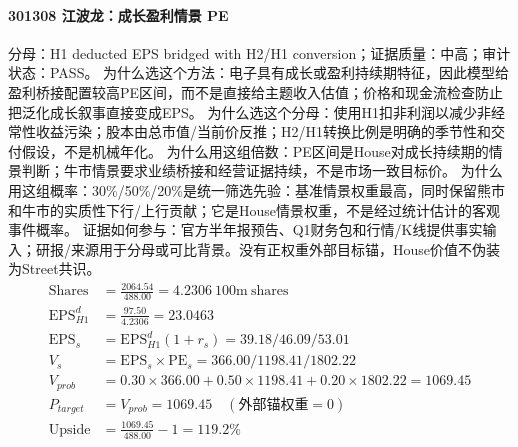 \paragraph{301308 江波龙：成长盈利情景 PE}
分母：H1 deducted EPS bridged with H2/H1 conversion；证据质量：中高；审计状态：PASS。
为什么选这个方法：电子具有成长或盈利持续期特征，因此模型给盈利桥接配置较高PE区间，而不是直接给主题收入估值；价格和现金流检查防止把泛化成长叙事直接变成EPS。
为什么选这个分母：使用H1扣非利润以减少非经常性收益污染；股本由总市值/当前价反推；H2/H1转换比例是明确的季节性和交付假设，不是机械年化。
为什么用这组倍数：PE区间是House对成长持续期的情景判断；牛市情景要求业绩桥接和经营证据持续，不是市场一致目标价。
为什么用这组概率：30\%/50\%/20\%是统一筛选先验：基准情景权重最高，同时保留熊市和牛市的实质性下行/上行贡献；它是House情景权重，不是经过统计估计的客观事件概率。
证据如何参与：官方半年报预告、Q1财务包和行情/K线提供事实输入；研报/来源用于分母或可比背景。没有正权重外部目标锚，House价值不伪装为Street共识。
\begin{align*}
\mathrm{Shares} &= \frac{2064.54}{488.00}=4.2306\ \mathrm{100m\ shares}\\
\mathrm{EPS}_{H1}^d &= \frac{97.50}{4.2306}=23.0463\\
\mathrm{EPS}_s &= \mathrm{EPS}_{H1}^d(1+r_s)=39.18/46.09/53.01\\
V_s &= \mathrm{EPS}_s\times \mathrm{PE}_s=366.00/1198.41/1802.22\\
V_{prob} &= 0.30\times 366.00+0.50\times 1198.41+0.20\times 1802.22=1069.45\\
P_{target} &= V_{prob}=1069.45\quad(\text{外部锚权重}=0)\\
\mathrm{Upside} &= \frac{1069.45}{488.00}-1=119.2\%\\
\end{align*}

